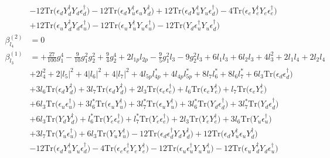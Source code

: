 {\begin{align}
 &-12 \mbox{Tr}\Big({\epsilon_d  Y_{d}^{\dagger}  Y_d  \epsilon_{d}^{\dagger}}\Big) -12 \mbox{Tr}\Big({\epsilon_d  Y_{u}^{\dagger}  \epsilon_u  Y_{d}^{\dagger}}\Big) +12 \mbox{Tr}\Big({\epsilon_d  Y_{u}^{\dagger}  Y_u  \epsilon_{d}^{\dagger}}\Big) -4 \mbox{Tr}\Big({\epsilon_e  Y_{e}^{\dagger}  Y_e  \epsilon_{e}^{\dagger}}\Big) \nonumber \\ 
 &+12 \mbox{Tr}\Big({\epsilon_u  Y_{d}^{\dagger}  Y_d  \epsilon_{u}^{\dagger}}\Big) -12 \mbox{Tr}\Big({\epsilon_u  Y_{u}^{\dagger}  Y_u  \epsilon_{u}^{\dagger}}\Big) -12 \mbox{Tr}\Big({Y_d  \epsilon_{u}^{\dagger}  Y_u  \epsilon_{d}^{\dagger}}\Big) \\ 
\beta_{l_4}^{(2)} & =  
0\\ 
\beta_{l_3}^{(1)} & =  
+\frac{27}{100} g_{1}^{4} -\frac{9}{10} g_{1}^{2} g_{2}^{2} +\frac{9}{4} g_{2}^{4} +2 l_{1p} l_{2p} -\frac{9}{5} g_{1}^{2} l_3 -9 g_{2}^{2} l_3 +6 l_1 l_3 +6 l_2 l_3 +4 l_{3}^{2} +2 l_1 l_4 +2 l_2 l_4 \nonumber \\ 
 &+2 l_{4}^{2} +2 |l_5|^2 +4 |l_6|^2 +4 |l_7|^2 +4 l_{5p} l_{4p}^* +4 l_{4p} l_{5p}^* +8 l_7 l_6^* +8 l_6 l_7^* +6 l_3 \mbox{Tr}\Big({\epsilon_d  \epsilon_{d}^{\dagger}}\Big) \nonumber \\ 
 &+3 l_6 \mbox{Tr}\Big({\epsilon_d  Y_{d}^{\dagger}}\Big) +3 l_7 \mbox{Tr}\Big({\epsilon_d  Y_{d}^{\dagger}}\Big) +2 l_3 \mbox{Tr}\Big({\epsilon_e  \epsilon_{e}^{\dagger}}\Big) +l_6 \mbox{Tr}\Big({\epsilon_e  Y_{e}^{\dagger}}\Big) +l_7 \mbox{Tr}\Big({\epsilon_e  Y_{e}^{\dagger}}\Big) \nonumber \\ 
 &+6 l_3 \mbox{Tr}\Big({\epsilon_u  \epsilon_{u}^{\dagger}}\Big) +3 l_6^* \mbox{Tr}\Big({\epsilon_u  Y_{u}^{\dagger}}\Big) +3 l_7^* \mbox{Tr}\Big({\epsilon_u  Y_{u}^{\dagger}}\Big) +3 l_6^* \mbox{Tr}\Big({Y_d  \epsilon_{d}^{\dagger}}\Big) +3 l_7^* \mbox{Tr}\Big({Y_d  \epsilon_{d}^{\dagger}}\Big) \nonumber \\ 
 &+6 l_3 \mbox{Tr}\Big({Y_d  Y_{d}^{\dagger}}\Big) +l_6^* \mbox{Tr}\Big({Y_e  \epsilon_{e}^{\dagger}}\Big) +l_7^* \mbox{Tr}\Big({Y_e  \epsilon_{e}^{\dagger}}\Big) +2 l_3 \mbox{Tr}\Big({Y_e  Y_{e}^{\dagger}}\Big) +3 l_6 \mbox{Tr}\Big({Y_u  \epsilon_{u}^{\dagger}}\Big) \nonumber \\ 
 &+3 l_7 \mbox{Tr}\Big({Y_u  \epsilon_{u}^{\dagger}}\Big) +6 l_3 \mbox{Tr}\Big({Y_u  Y_{u}^{\dagger}}\Big) -12 \mbox{Tr}\Big({\epsilon_d  \epsilon_{d}^{\dagger}  Y_d  Y_{d}^{\dagger}}\Big) +12 \mbox{Tr}\Big({\epsilon_d  Y_{u}^{\dagger}  \epsilon_u  Y_{d}^{\dagger}}\Big) \nonumber \\ 
 &-12 \mbox{Tr}\Big({\epsilon_d  Y_{u}^{\dagger}  Y_u  \epsilon_{d}^{\dagger}}\Big) -4 \mbox{Tr}\Big({\epsilon_e  \epsilon_{e}^{\dagger}  Y_e  Y_{e}^{\dagger}}\Big) -12 \mbox{Tr}\Big({\epsilon_u  \epsilon_{u}^{\dagger}  Y_u  Y_{u}^{\dagger}}\Big) -12 \mbox{Tr}\Big({\epsilon_u  Y_{d}^{\dagger}  Y_d  \epsilon_{u}^{\dagger}}\Big) \nonumber \\ 

\end{align}}
